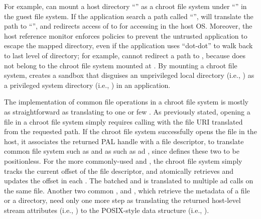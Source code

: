  



For example, \thelibos{} can mount a host directory ``'' as a chroot file system under ``'' in the guest file system.
If the application search a path called ``'', \thelibos{} will translate the path to ``'', and redirects access of  to \hostapis{} for accessing  in the host OS.
Moreover, the host reference monitor enforces policies
to prevent the untrusted application
to escape the mapped directory, even if the application uses ``dot-dot'' to walk back to last level of directory; for example, \thelibos{} cannot redirect a path  to , because  does not belong to the chroot file system mounted at .
By mounting a chroot file system, \thelibos{} creates a sandbox that disguises an unprivileged local directory (i.e., )
as a privileged system directory (i.e., ) in an application.
  

The implementation of common file operations in a chroot file system is mostly as straightforward as translating to one or few \hostapis{}.
As previously stated, opening a file in a chroot file system
simply requires calling  with the file URI translated from the requested path.
If the chroot file system successfully opens the file in the host,
it associates the returned PAL handle with a file descriptor, to translate common file system \linuxapis{} such as  and 
as \hostapis{} such as  ad , since \thehostabi{} defines these two \hostapis{} to be positionless.
For the more commonly-used  and ,
the chroot file system
simply tracks the current offset of the file descriptor, and atomically retrieves and updates the offset in each \linuxapi{}.
The batched  and 
is translated to multiple  ad  calls
on the same file.
Another two common \linuxapis{},
 and , which retrieve the metadata of a file or a directory,
need only one more step as
translating the returned host-level stream attributes
(i.e., )
to the POSIX-style data structure (i.e., ).


